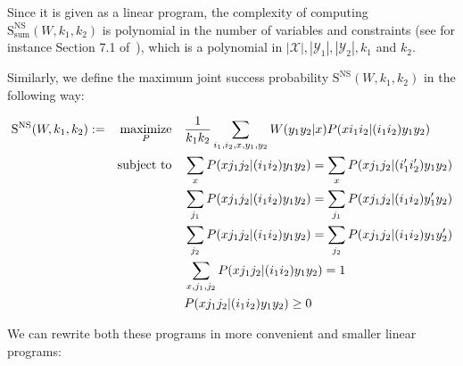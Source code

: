 Since it is given as a linear program, the complexity of computing $\mathrm{S}_{\text{sum}}^{\mathrm{NS}}(W,k_1,k_2)$ is polynomial in the number of variables and constraints (see for instance Section 7.1 of~\cite{GM07}), which is a polynomial in $|\mathcal{X}|,|\mathcal{Y}_1|,|\mathcal{Y}_2|, k_1$ and $k_2$.

Similarly, we define the maximum joint success probability $\mathrm{S}^{\mathrm{NS}}(W,k_1,k_2)$ in the following way:

\begin{equation}
  \begin{aligned}
    \mathrm{S}^{\mathrm{NS}}(W,k_1,k_2) := &&\underset{P}{\operatorname{\text{maximize}}} &&& \frac{1}{k_1k_2}\sum_{i_1,i_2,x,y_1,y_2} W(y_1y_2|x)P(xi_1i_2|(i_1i_2)y_1y_2)\\
    &&\operatorname{\text{subject to}} &&& \sum_{x} P(xj_1j_2|(i_1i_2)y_1y_2) = \sum_{x} P(xj_1j_2|(i_1'i_2')y_1y_2)\\
    &&&&& \sum_{j_1} P(xj_1j_2|(i_1i_2)y_1y_2) = \sum_{j_1} P(xj_1j_2|(i_1i_2)y_1'y_2)\\
    &&&&& \sum_{j_2} P(xj_1j_2|(i_1i_2)y_1y_2) = \sum_{j_2} P(xj_1j_2|(i_1i_2)y_1y_2')\\
    &&&&& \sum_{x,j_1,j_2} P(xj_1j_2|(i_1i_2)y_1y_2) = 1\\
    &&&&& P(xj_1j_2|(i_1i_2)y_1y_2) \geq 0
  \end{aligned}
\end{equation}

We can rewrite both these programs in more convenient and smaller linear programs:

